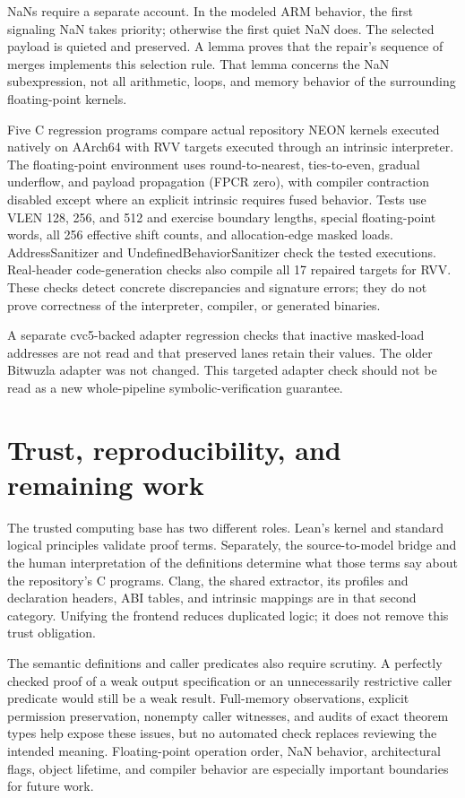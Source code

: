 \documentclass[11pt]{article}
\begin{document}
NaNs require a separate account. In the modeled ARM behavior, the first signaling NaN takes priority; otherwise the first quiet NaN does. The selected payload is quieted and preserved. A lemma proves that the repair's sequence of merges implements this selection rule. That lemma concerns the NaN subexpression, not all arithmetic, loops, and memory behavior of the surrounding floating-point kernels.

Five C regression programs compare actual repository NEON kernels executed natively on AArch64 with RVV targets executed through an intrinsic interpreter. The floating-point environment uses round-to-nearest, ties-to-even, gradual underflow, and payload propagation (FPCR zero), with compiler contraction disabled except where an explicit intrinsic requires fused behavior. Tests use VLEN 128, 256, and 512 and exercise boundary lengths, special floating-point words, all 256 effective shift counts, and allocation-edge masked loads. AddressSanitizer and UndefinedBehaviorSanitizer check the tested executions. Real-header code-generation checks also compile all 17 repaired targets for RVV. These checks detect concrete discrepancies and signature errors; they do not prove correctness of the interpreter, compiler, or generated binaries.

A separate cvc5-backed adapter regression checks that inactive masked-load addresses are not read and that preserved lanes retain their values. The older Bitwuzla adapter was not changed. This targeted adapter check should not be read as a new whole-pipeline symbolic-verification guarantee.

\section{Trust, reproducibility, and remaining work}\label{sec:reproduce}
The trusted computing base has two different roles. Lean's kernel and standard logical principles validate proof terms. Separately, the source-to-model bridge and the human interpretation of the definitions determine what those terms say about the repository's C programs. Clang, the shared extractor, its profiles and declaration headers, ABI tables, and intrinsic mappings are in that second category. Unifying the frontend reduces duplicated logic; it does not remove this trust obligation.

The semantic definitions and caller predicates also require scrutiny. A perfectly checked proof of a weak output specification or an unnecessarily restrictive caller predicate would still be a weak result. Full-memory observations, explicit permission preservation, nonempty caller witnesses, and audits of exact theorem types help expose these issues, but no automated check replaces reviewing the intended meaning. Floating-point operation order, NaN behavior, architectural flags, object lifetime, and compiler behavior are especially important boundaries for future work.
\end{document}
